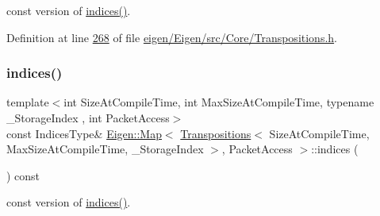const version of \hyperlink{class_eigen_1_1_map_3_01_transpositions_3_01_size_at_compile_time_00_01_max_size_at_compile_timecc993082d7c0ba51ca94b27e97da8dd3_a1f8c96b93122a0e3237a05c11e8812c5}{indices()}. 

Definition at line \hyperlink{eigen_2_eigen_2src_2_core_2_transpositions_8h_source_l00268}{268} of file \hyperlink{eigen_2_eigen_2src_2_core_2_transpositions_8h_source}{eigen/\+Eigen/src/\+Core/\+Transpositions.\+h}.

\mbox{\label{class_eigen_1_1_map_3_01_transpositions_3_01_size_at_compile_time_00_01_max_size_at_compile_timecc993082d7c0ba51ca94b27e97da8dd3_a08d5e1dd2e82fc92b82873bf740e4f24}} 
\subsubsection{\texorpdfstring{indices()}{indices()}\hspace{0.1cm}{\footnotesize\ttfamily [2/4]}}
{\footnotesize\ttfamily template$<$int Size\+At\+Compile\+Time, int Max\+Size\+At\+Compile\+Time, typename \+\_\+\+Storage\+Index , int Packet\+Access$>$ \\
const Indices\+Type\& \hyperlink{group___core___module_class_eigen_1_1_map}{Eigen\+::\+Map}$<$ \hyperlink{group___core___module_class_eigen_1_1_transpositions}{Transpositions}$<$ Size\+At\+Compile\+Time, Max\+Size\+At\+Compile\+Time, \+\_\+\+Storage\+Index $>$, Packet\+Access $>$\+::indices (\begin{DoxyParamCaption}{ }\end{DoxyParamCaption}) const\hspace{0.3cm}{\ttfamily [inline]}}

const version of \hyperlink{class_eigen_1_1_map_3_01_transpositions_3_01_size_at_compile_time_00_01_max_size_at_compile_timecc993082d7c0ba51ca94b27e97da8dd3_a1f8c96b93122a0e3237a05c11e8812c5}{indices()}. 

